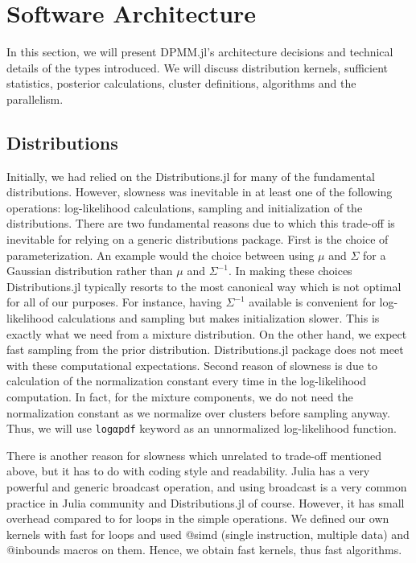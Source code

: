 \documentclass[12pt, a4paper]{article}
\begin{document}
\section{Software Architecture}\label{sec:softwarearch}
In this section, we will present DPMM.jl's architecture decisions and technical details of the types introduced. We will discuss distribution kernels, sufficient statistics, posterior calculations, cluster definitions, algorithms and the parallelism.

\subsection{Distributions}
Initially, we had relied on the Distributions.jl \cite{Distributions.jl-2019} for many of the fundamental distributions. However, slowness was inevitable in at least one of the following operations: log-likelihood calculations, sampling and initialization of the distributions. There are two fundamental reasons due to which this trade-off is inevitable for relying on a generic distributions package. First is the choice of parameterization. An example would the choice between using $\mu$ and $\Sigma$ for a Gaussian distribution rather than $\mu$ and $\Sigma^{-1}$. In making these choices Distributions.jl typically resorts to the most canonical way which is not optimal for all of our purposes. For instance, having $\Sigma ^{-1}$ available is convenient for log-likelihood calculations and sampling but makes initialization slower. This is exactly what we need from a mixture distribution. On the other hand, we expect fast sampling from the prior distribution. Distributions.jl package does not meet with these computational expectations. Second reason of slowness is due to calculation of the normalization constant every time in the log-likelihood computation. In fact, for the mixture components, we do not need the normalization constant as we normalize over clusters before sampling anyway. Thus, we will use \texttt{logαpdf} keyword as an unnormalized log-likelihood function.

There is another reason for slowness which unrelated to trade-off mentioned above, but it has to do with coding style and readability. Julia has a very powerful and generic broadcast operation, and using broadcast is a very common practice in Julia community and Distributions.jl of course. However, it has small overhead compared to for loops in the simple operations. We defined our own kernels with fast for loops and used @simd (single instruction, multiple data) and @inbounds macros on them. Hence, we obtain fast kernels, thus fast algorithms.
\end{document}
